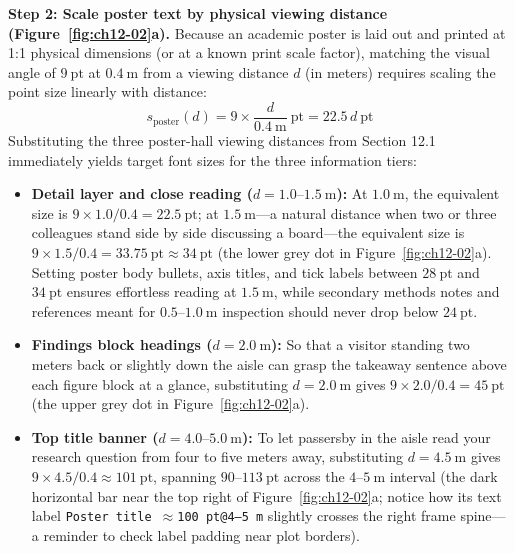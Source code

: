 \textbf{Step 2: Scale poster text by physical viewing distance (Figure~\ref{fig:ch12-02}a).} Because an academic poster is laid out and printed at 1:1 physical dimensions (or at a known print scale factor), matching the visual angle of $9\ \text{pt}$ at $0.4\ \text{m}$ from a viewing distance $d$ (in meters) requires scaling the point size linearly with distance:
\[
s_{\text{poster}}(d) = 9 \times \frac{d}{0.4\ \text{m}}\ \text{pt} = 22.5\,d\ \text{pt}
\]
Substituting the three poster-hall viewing distances from Section 12.1 immediately yields target font sizes for the three information tiers:
\begin{itemize}
\item \textbf{Detail layer and close reading ($d = 1.0\text{--}1.5\ \text{m}$):} At $1.0\ \text{m}$, the equivalent size is $9 \times 1.0 / 0.4 = 22.5\ \text{pt}$; at $1.5\ \text{m}$---a natural distance when two or three colleagues stand side by side discussing a board---the equivalent size is $9 \times 1.5 / 0.4 = 33.75\ \text{pt} \approx 34\ \text{pt}$ (the lower grey dot in Figure~\ref{fig:ch12-02}a). Setting poster body bullets, axis titles, and tick labels between $28\ \text{pt}$ and $34\ \text{pt}$ ensures effortless reading at $1.5\ \text{m}$, while secondary methods notes and references meant for $0.5\text{--}1.0\ \text{m}$ inspection should never drop below $24\ \text{pt}$.
\item \textbf{Findings block headings ($d = 2.0\ \text{m}$):} So that a visitor standing two meters back or slightly down the aisle can grasp the takeaway sentence above each figure block at a glance, substituting $d = 2.0\ \text{m}$ gives $9 \times 2.0 / 0.4 = 45\ \text{pt}$ (the upper grey dot in Figure~\ref{fig:ch12-02}a).
\item \textbf{Top title banner ($d = 4.0\text{--}5.0\ \text{m}$):} To let passersby in the aisle read your research question from four to five meters away, substituting $d = 4.5\ \text{m}$ gives $9 \times 4.5 / 0.4 \approx 101\ \text{pt}$, spanning $90\text{--}113\ \text{pt}$ across the $4\text{--}5\ \text{m}$ interval (the dark horizontal bar near the top right of Figure~\ref{fig:ch12-02}a; notice how its text label \texttt{Poster title $\approx$100 pt@4--5 m} slightly crosses the right frame spine---a reminder to check label padding near plot borders).
\end{itemize}

